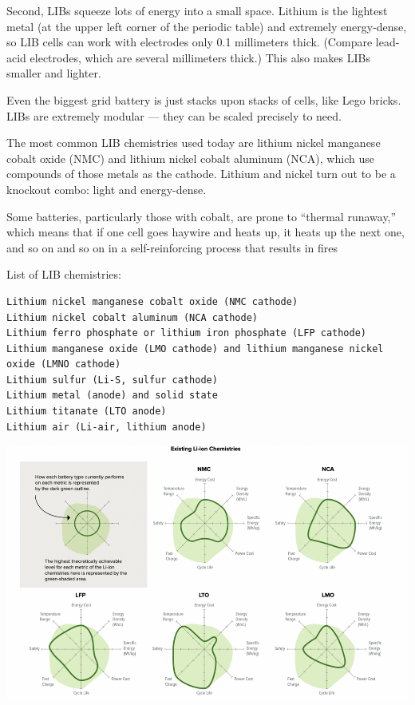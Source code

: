 \documentclass[
]{book}
\begin{document}
Second, LIBs squeeze lots of energy into a small space. Lithium is the lightest metal (at the upper left corner of the periodic table) and extremely energy-dense, so LIB cells can work with electrodes only 0.1 millimeters thick. (Compare lead-acid electrodes, which are several millimeters thick.) This also makes LIBs smaller and lighter.

Even the biggest grid battery is just stacks upon stacks of cells, like Lego bricks. LIBs are extremely modular --- they can be scaled precisely to need.

The most common LIB chemistries used today are lithium nickel manganese cobalt oxide (NMC) and lithium nickel cobalt aluminum (NCA), which use compounds of those metals as the cathode. Lithium and nickel turn out to be a knockout combo: light and energy-dense.

Some batteries, particularly those with cobalt, are prone to ``thermal runaway,'' which means that if one cell goes haywire and heats up, it heats up the next one, and so on and so on in a self-reinforcing process that results in fires

List of LIB chemistries:

\begin{verbatim}
Lithium nickel manganese cobalt oxide (NMC cathode)
Lithium nickel cobalt aluminum (NCA cathode)
Lithium ferro phosphate or lithium iron phosphate (LFP cathode)
Lithium manganese oxide (LMO cathode) and lithium manganese nickel oxide (LMNO cathode)
Lithium sulfur (Li-S, sulfur cathode)
Lithium metal (anode) and solid state
Lithium titanate (LTO anode)
Lithium air (Li-air, lithium anode)
\end{verbatim}

\includegraphics{fig/LithiumIon_chemistries.png}
\end{document}
